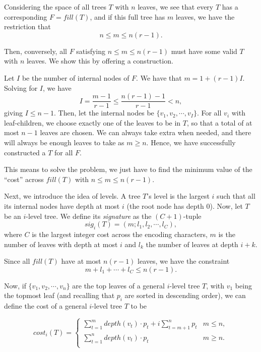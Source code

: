 \documentclass[a4paper,10pt,english]{scrartcl}
\begin{document}
Considering the space of all trees $T$ with $n$ leaves, we see that every $T$ has a corresponding $F= fill(T)$, and if this full tree has $m$ leaves, we have the restriction that $$n \le m \le n(r-1).$$ 

Then, conversely, all $F$ satisfying $n \le m \le n(r-1)$ must have some valid $T$ with $n$ leaves. We show this by offering a construction.

Let $I$ be the number of internal nodes of $F$. We have that $m = 1 + (r-1)I$. Solving for $I$, we have $$I = \frac{m-1}{r-1} \le \frac{n(r-1)-1}{r-1}<n,$$ giving $I \le n-1$. Then, let the internal nodes be $\{v_1,v_2, \cdots, v_I\}$. For all $v_i$ with leaf-children, we choose exactly one of the leaves to be in $T$, so that a total of at most $n-1$ leaves are chosen. We can always take extra when needed, and there will always be enough leaves to take as $m \ge n$. Hence, we have successfully constructed a $T$ for all $F$. 

This means to solve the problem, we just have to find the minimum value of the ``cost'' across $fill(T)$ with $n \le m \le n(r-1)$.

Next, we introduce the idea of levels. A tree $T$'s level is the largest $i$ such that all its internal nodes have depth at most $i$ (the root node has depth 0). Now, let $T$ be an $i$-level tree. We define its \textit{signature} as the $(C+1)$-tuple $$sig_i(T) = (m;l_1,l_2,\cdots,l_C),$$ where $C$ is the largest integer cost across the encoding characters, $m$ is the number of leaves with depth at most $i$ and $l_k$ the number of leaves at depth $i+k$.

Since all $fill(T)$ have at most $n(r-1)$ leaves, we have the constraint $$m+l_1+\cdots +l_C \le n(r-1).$$

Now, if $\{v_1, v_2, \cdots , v_n\}$ are the top leaves of a general $i$-level tree $T$, with $v_1$ being the topmost leaf (and recalling that $p_i$ are sorted in descending order), we can define the cost of a general $i$-level tree $T$ to be 

\begin{equation}\label{eq:cost}
    cost_i(T) = \begin{cases}
        \sum_{t=1}^m depth(v_t)\cdot p_t+i \sum_{t=m+1}^n p_t & m \le n,\\
        \sum_{t=1}^n depth(v_t)\cdot p_t & m \ge n.\\
    \end{cases}
\end{equation}
\end{document}
